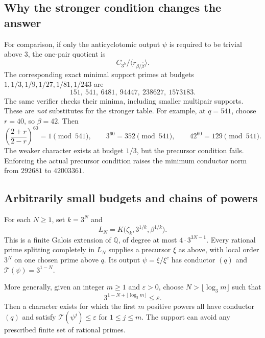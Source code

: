 \subsection{Why the stronger condition changes the answer}

For comparison, if only the anticyclotomic output $\psi$ is required
to be trivial above $3$, the one-pair quotient is
\[
 C_{3^h}/\langle r_{\beta/\bar\beta}\rangle.
\]
The corresponding exact minimal support primes at budgets
$1,1/3,1/9,1/27,1/81,1/243$ are
\[
                  151,\ 541,\ 6481,\ 94447,\ 238627,\ 1573183.
\]
The same verifier checks their minima, including smaller multipair
supports.  These are \emph{not} substitutes for the stronger table.
For example, at $q=541$, choose $r=40$, so $\beta=42$.  Then
\[
 \left(\frac{2+r}{2-r}\right)^{60}=1\pmod{541},\qquad
             3^{60}=352\pmod{541},\qquad
            42^{60}=129\pmod{541}.
\]
The weaker character exists at budget $1/3$, but the precursor
condition fails.  Enforcing the actual precursor condition raises
the minimum conductor norm from $292681$ to $42003361$.

\subsection{Arbitrarily small budgets and chains of powers}

\begin{theorem}
\label{thm:source_twist_all_budgets}
For each $N\ge1$, set $k=3^N$ and
\[
 L_N=K\bigl(\zeta_k,3^{1/k},\beta^{1/k}\bigr).
\]
This is a finite Galois extension of $\mathbb Q$, of degree at most
$4\cdot3^{3N-1}$.  Every rational prime splitting completely in
$L_N$ supplies a precursor $\xi$ as above, with local order $3^N$
on one chosen prime above $q$.  Its output $\psi=\xi/\xi^c$ has
conductor $(q)$ and $\mathcal T(\psi)=3^{1-N}$.

More generally, given an integer $m\ge1$ and $\varepsilon>0$, choose
$N>\lfloor\log_3m\rfloor$ such that
\[
             3^{1-N+\lfloor\log_3m\rfloor}\le\varepsilon.
\]
Then a character exists for which the first $m$ positive powers all
have conductor $(q)$ and satisfy
$\mathcal T(\psi^j)\le\varepsilon$ for $1\le j\le m$.
The support can avoid any prescribed finite set of rational primes.
\end{theorem}

